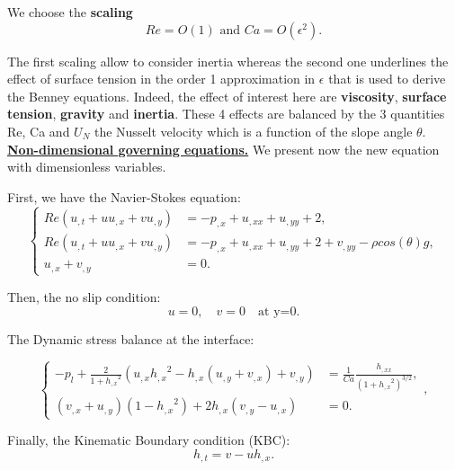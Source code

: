 \documentclass[12pt]{article}
\begin{document}
We choose the \textbf{scaling} 
\begin{equation}\label{scaling_Re_Ca}
    \boxed{
Re=O(1) \text{ and } Ca=O(\epsilon^2).
    } 
\end{equation}

The first scaling allow to consider inertia whereas the second one underlines the effect of surface tension in the order 1 approximation in $\epsilon$ that 
is used to derive the Benney equations. 
Indeed, the effect of interest here are \textbf{viscosity}, \textbf{surface tension}, \textbf{gravity} and \textbf{inertia}. These 4 effects are balanced by the 3 quantities Re, Ca and $U_N$ the Nusselt velocity which is a function of the slope angle $\theta$.
\\
            
 \underline{\textbf{Non-dimensional governing equations.}} We present now the new equation with dimensionless variables.

First, we have the Navier-Stokes equation:
\begin{equation}\label{eq NavierStokes1}
\left\{
\begin{aligned}
    Re(u_{,t}+uu_{,x}+vu_{,y}) &= -p_{,x} + u_{,xx} + u_{,yy} + 2,\\
    Re(u_{,t}+uu_{,x}+vu_{,y}) &= -p_{,x} + u_{,xx} + u_{,yy} + 2 + v_{,yy} - \rho cos(\theta)g,\\
     u_{,x} + v_{,y} &= 0 .
\end{aligned}
\right.
\end{equation}


Then, the no slip condition: 
\begin{equation}\label{eq_no_slip}
    u=0, \quad v=0 \quad \text{at y=0}.
\end{equation}

The Dynamic stress balance at the interface: 

\begin{equation}\label{eq DBC}
\left\{
\begin{aligned}
    - p_l + \frac{2}{1+{h_{,x}}^2}(u_{,x}{h_{,x}}^2 - h_{,x}(u_{,y} + v_{,x})+v_{,y}) &= \frac{1}{Ca} \frac{h_{,xx}}{(1+{h_{,x}}^2)^{3/2}},\\
    (v_{,x} + u_{,y})(1-{h_{,x}}^2)+2h_{,x}(v_{,y}-u_{,x})&=0.
\end{aligned}
\right.,
\end{equation}


Finally, the Kinematic Boundary condition (KBC): 
\begin{equation}\label{eq KBC}
    h_{,t} = v-uh_{,x}.
\end{equation}
\end{document}
